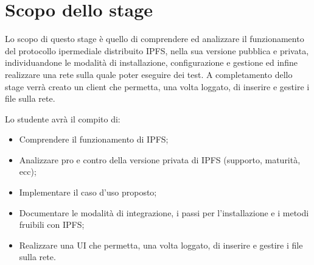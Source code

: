 \section*{Scopo dello stage}
Lo scopo di questo stage è quello di comprendere ed analizzare il funzionamento del protocollo ipermediale distribuito IPFS, nella sua versione pubblica e privata, individuandone le modalità di installazione, configurazione e gestione ed infine realizzare una rete sulla quale poter eseguire dei test. A completamento dello stage verrà creato un client che permetta, una volta loggato, di inserire  e gestire i file sulla rete. 

Lo studente avrà il compito di:
\begin{itemize}
\item Comprendere il funzionamento di IPFS;
\item Analizzare pro e contro della versione privata di IPFS (supporto, maturità, ecc);
\item Implementare il caso d’uso proposto;
\item Documentare le modalità di integrazione, i passi per l’installazione e i metodi fruibili con IPFS;
\item Realizzare una UI che permetta, una volta loggato, di inserire  e gestire i file sulla rete.  

\end{itemize}


